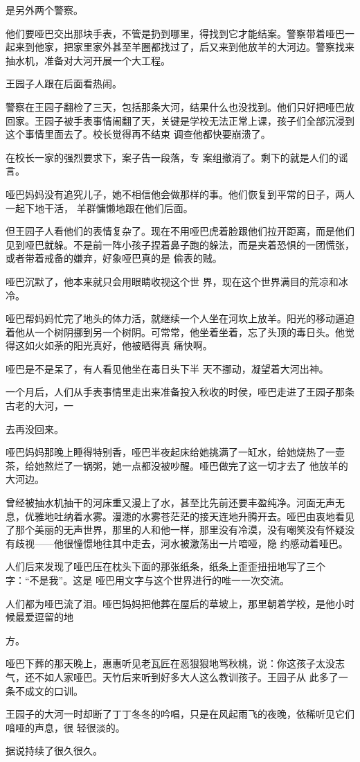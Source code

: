 \documentclass{article}
\begin{document}
\newpage
是另外两个警察。 

他们要哑巴交出那块手表，不管是扔到哪里，得找到它才能结案。警察带着哑巴一起来到他家，把家里家外甚至羊圈都找过了，后又来到他放羊的大河边。警察找来抽水机，准备对大河开展一个大工程。


王园子人跟在后面看热闹。 

警察在王园子翻检了三天，包括那条大河，结果什么也没找到。他们只好把哑巴放回家。王园子被手表事情闹翻了天，关键是学校无法正常上课，孩子们全部沉浸到这个事情里面去了。校长觉得再不结束
调查他都快要崩溃了。 

在校长一家的强烈要求下，案子告一段落，专
案组撤消了。剩下的就是人们的谣言。 

哑巴妈妈没有追究儿子，她不相信他会做那样的事。他们恢复到平常的日子，两人一起下地干活，
羊群慵懒地跟在他们后面。 

\newpage

但王园子人看他们的表情复杂了。现在不用哑巴虎着脸跟他们拉开距离，而是他们见到哑巴就躲。不是前一阵小孩子捏着鼻子跑的躲法，而是夹着恐惧的一团慌张，或者带着戒备的嫌弃，好象哑巴真的是
偷表的贼。 

哑巴沉默了，他本来就只会用眼睛收视这个世
界，现在这个世界满目的荒凉和冰冷。 

哑巴帮妈妈忙完了地头的体力活，就继续一个人坐在河坎上放羊。阳光的移动逼迫着他从一个树阴挪到另一个树阴。可常常，他坐着坐着，忘了头顶的毒日头。他觉得这如火如荼的阳光真好，他被晒得真
痛快啊。 

哑巴是不是呆了，有人看见他坐在毒日头下半
天不挪动，凝望着大河出神。 

一个月后，人们从手表事情里走出来准备投入秋收的时侯，哑巴走进了王园子那条古老的大河，一

\newpage
去再没回来。 

哑巴妈妈那晚上睡得特别香，哑巴半夜起床给她挑满了一缸水，给她烧热了一壶茶，给她熬烂了一锅粥，她一点都没被吵醒。哑巴做完了这一切才去了
他放羊的大河边。 

曾经被抽水机抽干的河床重又漫上了水，甚至比先前还要丰盈纯净。河面无声无息，优雅地吐纳着水雾。漫漶的水雾苍茫茫的接天连地升腾开去。哑巴由衷地看见了那个美丽的无声世界，那里的人和他一样，那里没有冷漠，没有嘲笑没有怀疑没有歧视——他很憧憬地往其中走去，河水被激荡出一片喑哑，隐
约感动着哑巴。 

人们后来发现了哑巴压在枕头下面的那张纸条，纸条上歪歪扭扭地写了三个字：“不是我”。这是
哑巴用文字与这个世界进行的唯一一次交流。 

人们都为哑巴流了泪。哑巴妈妈把他葬在屋后的草坡上，那里朝着学校，是他小时候最爱逗留的地

\newpage
方。 

哑巴下葬的那天晚上，惠惠听见老瓦匠在恶狠狠地骂秋桃，说：你这孩子太没志气，还不如人家哑巴。天竹后来听到好多大人这么教训孩子。王园子从
此多了一条不成文的口训。 

王园子的大河一时却断了丁丁冬冬的吟唱，只是在风起雨飞的夜晚，依稀听见它们喑哑的声息，很
轻很淡的。 


据说持续了很久很久。 
\end{document}
